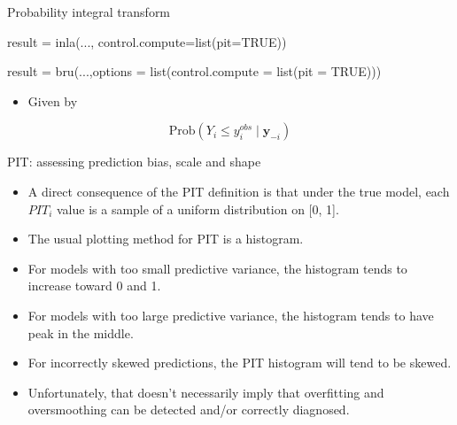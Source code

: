 \documentclass[
  ignorenonframetext,
]{beamer}
\newenvironment{Shaded}{\begin{snugshade}}{\end{snugshade}}
\newcommand{\AttributeTok}[1]{\textcolor[rgb]{0.77,0.63,0.00}{#1}}
\newcommand{\ConstantTok}[1]{\textcolor[rgb]{0.00,0.00,0.00}{#1}}
\newcommand{\FunctionTok}[1]{\textcolor[rgb]{0.00,0.00,0.00}{#1}}
\newcommand{\NormalTok}[1]{#1}
\newcommand{\OtherTok}[1]{\textcolor[rgb]{0.56,0.35,0.01}{#1}}
\providecommand{\tightlist}{%
  \setlength{\itemsep}{0pt}\setlength{\parskip}{0pt}}
\begin{document}
\begin{frame}[fragile]{Probability integral transform}
\protect\hypertarget{probability-integral-transform}{}
\small

\begin{Shaded}
\begin{Highlighting}[]
\NormalTok{result }\OtherTok{=} \FunctionTok{inla}\NormalTok{(...,}
              \AttributeTok{control.compute=}\FunctionTok{list}\NormalTok{(}\AttributeTok{pit=}\ConstantTok{TRUE}\NormalTok{))}

\NormalTok{result }\OtherTok{=} \FunctionTok{bru}\NormalTok{(...,}\AttributeTok{options =} \FunctionTok{list}\NormalTok{(}\AttributeTok{control.compute =} 
                                  \FunctionTok{list}\NormalTok{(}\AttributeTok{pit =} \ConstantTok{TRUE}\NormalTok{)))}
\end{Highlighting}
\end{Shaded}

\normalsize

\begin{itemize}
\tightlist
\item
  Given by
\end{itemize}

\[
\text{Prob}(Y_i \leq y_i^{obs} \mid \boldsymbol{y}_{-i})
\]
\end{frame}

\begin{frame}{PIT: assessing prediction bias, scale and shape}
\protect\hypertarget{pit-assessing-prediction-bias-scale-and-shape}{}
\begin{itemize}
\item
  A direct consequence of the PIT definition is that under the true
  model, each \(PIT_i\) value is a sample of a uniform distribution on
  {[}0, 1{]}.
\item
  The usual plotting method for PIT is a histogram.
\item
  For models with too small predictive variance, the histogram tends to
  increase toward 0 and 1.
\item
  For models with too large predictive variance, the histogram tends to
  have peak in the middle.
\item
  For incorrectly skewed predictions, the PIT histogram will tend to be
  skewed.
\item
  Unfortunately, that doesn't necessarily imply that overfitting and
  oversmoothing can be detected and/or correctly diagnosed.
\end{itemize}
\end{frame}
\end{document}
